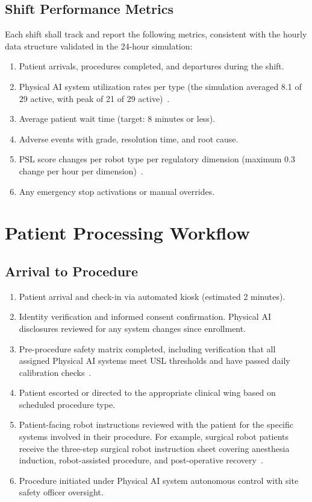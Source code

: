 \subsection{Shift Performance Metrics}

Each shift shall track and report the following metrics, consistent with the
hourly data structure validated in the 24-hour simulation:

\begin{enumerate}[label=(\alph*)]
\item Patient arrivals, procedures completed, and departures during the shift.
\item Physical AI system utilization rates per type (the simulation averaged
  8.1 of 29 active, with peak of 21 of 29 active)~\cite{newtrial2026}.
\item Average patient wait time (target: 8 minutes or less).
\item Adverse events with grade, resolution time, and root cause.
\item PSL score changes per robot type per regulatory dimension (maximum
  0.3 change per hour per dimension)~\cite{pslframework2026}.
\item Any emergency stop activations or manual overrides.
\end{enumerate}

\section{Patient Processing Workflow}

\subsection{Arrival to Procedure}

\begin{enumerate}[label=(\alph*)]
\item Patient arrival and check-in via automated kiosk (estimated 2 minutes).
\item Identity verification and informed consent confirmation. Physical AI
  disclosures reviewed for any system changes since enrollment.
\item Pre-procedure safety matrix completed, including verification that all
  assigned Physical AI systems meet USL thresholds and have passed daily
  calibration checks~\cite{cfr50adapt}.
\item Patient escorted or directed to the appropriate clinical wing based on
  scheduled procedure type.
\item Patient-facing robot instructions reviewed with the patient for the
  specific systems involved in their procedure. For example, surgical robot
  patients receive the three-step surgical robot instruction sheet covering
  anesthesia induction, robot-assisted procedure, and post-operative
  recovery~\cite{patientinstructions2026}.
\item Procedure initiated under Physical AI system autonomous control with
  site safety officer oversight.
\end{enumerate}

